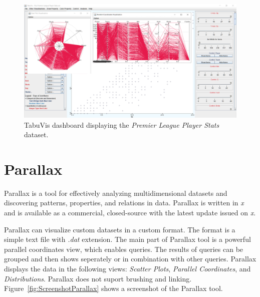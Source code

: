 \begin{figure}[tp]
\centering
\includegraphics[keepaspectratio,width=\linewidth,height=\halfh]
{images/screenshot-tabuvis.png}

\caption[TabuVis Dashboard]
{%
TabuVis dashboard displaying the \emph{Premier League Player Stats} dataset.
}
\label{fig:ScreenshotTabuVis}
\end{figure}



\section{Parallax}

Parallax \parencite{inselberg2008parallel} is a tool for effectively analyzing
multidimensional datasets and discovering patterns, properties, and
relations in data. Parallax is written in \emph{x} and is available as
a commercial, closed-source with the latest update issued on \emph{x}.

Parallax can visualize custom datasets in a custom format. The format is a
simple text file with \emph{.dat} extension. The main part of Parallax
tool is a powerful parallel coordinates view, which enables queries. The
results of queries can be grouped and then shows seperately or in
combination with other queries. Parallax displays the data in the
following views: \emph{Scatter Plots}, \emph{Parallel Coordinates}, and
\emph{Distributions}. Parallax does not suport brushing and linking.
Figure~\ref{fig:ScreenshotParallax} shows a screenshot of the Parallax tool.





